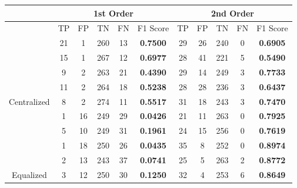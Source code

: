 \documentclass[10pt,a4paper]{article}
\begin{document}
		\begin{table}[!h]
			\centering
			\begin{tabular}{|c|c|c|c|c|c|c|c|c|c|c|}
				\hline
				& \multicolumn{5}{c|}{1st Order}                                                     & \multicolumn{5}{c|}{2nd Order}                              \\ \hline
				& TP & FP & TN  & FN                        & F1 Score                               & TP & FP & TN  & FN & F1 Score                               \\ \hline
				& 21 & 1  & 260 & {\color[HTML]{333333} 13} & {\color[HTML]{FE0000} \textbf{0.7500}} & 29 & 26 & 240 & 0  & {\color[HTML]{FE0000} \textbf{0.6905}} \\ \cline{2-11} 
				& 15 & 1  & 267 & {\color[HTML]{333333} 12} & {\color[HTML]{FE0000} \textbf{0.6977}} & 28 & 41 & 221 & 5  & {\color[HTML]{FE0000} \textbf{0.5490}} \\ \cline{2-11} 
				& 9  & 2  & 263 & {\color[HTML]{333333} 21} & {\color[HTML]{FE0000} \textbf{0.4390}} & 29 & 14 & 249 & 3  & {\color[HTML]{FE0000} \textbf{0.7733}} \\ \cline{2-11} 
				& 11 & 2  & 264 & {\color[HTML]{333333} 18} & {\color[HTML]{FE0000} \textbf{0.5238}} & 28 & 28 & 236 & 3  & {\color[HTML]{FE0000} \textbf{0.6437}} \\ \cline{2-11} 
				\multirow{-5}{*}{Centralized} & 8  & 2  & 274 & {\color[HTML]{333333} 11} & {\color[HTML]{FE0000} \textbf{0.5517}} & 31 & 18 & 243 & 3  & {\color[HTML]{FE0000} \textbf{0.7470}} \\ \hline
				& 1  & 16 & 249 & {\color[HTML]{333333} 29} & {\color[HTML]{FE0000} \textbf{0.0426}} & 21 & 11 & 263 & 0  & {\color[HTML]{FE0000} \textbf{0.7925}} \\ \cline{2-11} 
				& 5  & 10 & 249 & {\color[HTML]{333333} 31} & {\color[HTML]{FE0000} \textbf{0.1961}} & 24 & 15 & 256 & 0  & {\color[HTML]{FE0000} \textbf{0.7619}} \\ \cline{2-11} 
				& 1  & 18 & 250 & {\color[HTML]{333333} 26} & {\color[HTML]{FE0000} \textbf{0.0435}} & 35 & 8  & 252 & 0  & {\color[HTML]{FE0000} \textbf{0.8974}} \\ \cline{2-11} 
				& 2  & 13 & 243 & {\color[HTML]{333333} 37} & {\color[HTML]{FE0000} \textbf{0.0741}} & 25 & 5  & 263 & 2  & {\color[HTML]{FE0000} \textbf{0.8772}} \\ \cline{2-11} 
				\multirow{-5}{*}{Equalized}   & 3  & 12 & 250 & {\color[HTML]{333333} 30} & {\color[HTML]{FE0000} \textbf{0.1250}} & 32 & 4  & 253 & 6  & {\color[HTML]{FE0000} \textbf{0.8649}} \\ \hline
			\end{tabular}
		\end{table}
		
\end{document}
